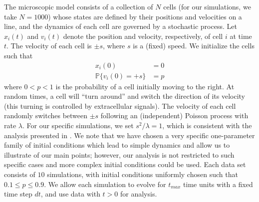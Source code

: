 \documentclass[3p]{elsarticle}
\begin{document}
The microscopic model consists of a collection of $N$ cells (for our simulations, we take $N=1000$) whose states are defined by their positions and velocities on a line, and the dynamics of each cell are governed by a stochastic process.
%
Let $x_i(t)$ and $v_i(t)$ denote the position and velocity, respectively, of cell $i$ at time $t$.
%
The velocity of each cell is $\pm s$, where $s$ is a (fixed) speed. 
%
We initialize the cells such that
\begin{equation}\label{eqn:system}
\begin{aligned}
x_i(0) & = 0 \\
\mathbb{P} \{ v_i(0) = +s \} & = p
\end{aligned}
\end{equation}
where $0 < p < 1$ is the probability of a cell initially moving to the right.
%
At random times, a cell will ``turn around'' and switch the direction of its velocity (this turning is controlled by extracellular signals). 
%
The velocity of each cell randomly switches between $\pm s$ following an (independent) Poisson process with rate $\lambda$.
%
For our specific simulations, we set $s^2/\lambda=1$, which is consistent with the analysis presented in \cite{othmer1988models}. 
%
We note that we have chosen a very specific one-parameter family of initial conditions which lead to simple dynamics and allow us to illustrate of our main points;
however, our analysis is not restricted to such specific cases and more complex initial conditions could be used. 
%
Each data set consists of $10$ simulations, with initial conditions uniformly chosen such that $0.1 \le p  \le 0.9$. 
%
We allow each simulation to evolve for $t_{max}$ time units with a fixed time step $dt$, and use data with $t > 0$ for analysis. 
\end{document}
